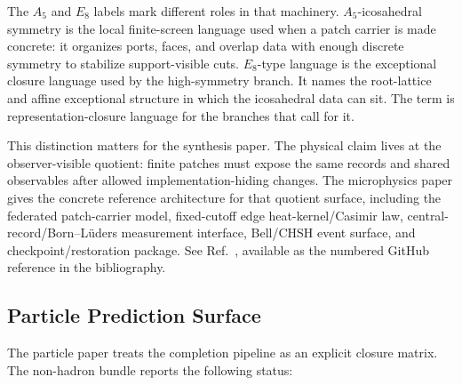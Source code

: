\documentclass[11pt]{article}
\begin{document}
The \(A_5\) and \(E_8\) labels mark different roles in that machinery. \(A_5\)-icosahedral symmetry
is the local finite-screen language used when a patch carrier is made concrete: it organizes ports,
faces, and overlap data with enough discrete symmetry to stabilize support-visible cuts.
\(E_8\)-type language is the exceptional closure language used by the high-symmetry branch. It names
the root-lattice and affine exceptional structure in which the icosahedral data can sit. The term
is representation-closure language for the branches that call for it.

This distinction matters for the synthesis paper. The physical claim lives at the observer-visible
quotient: finite patches must expose the same records and shared observables after allowed
implementation-hiding changes. The microphysics paper gives the concrete reference architecture for
that quotient surface, including the federated patch-carrier model, fixed-cutoff edge
heat-kernel/Casimir law, central-record/Born--L\"uders measurement interface, Bell/CHSH event
surface, and checkpoint/restoration package. See Ref.~\cite{ophmicrophysics}, available as the
numbered GitHub reference in the bibliography.

\subsection*{Particle Prediction Surface}

The particle paper treats the completion pipeline as an explicit closure matrix. The non-hadron
bundle reports the following status:
\end{document}
